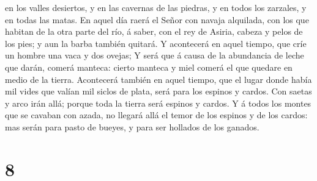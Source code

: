 en los valles desiertos, y en las cavernas de las piedras, y en todos
los zarzales, y en todas las matas.  En aquel día raerá
el Señor con navaja alquilada, con los que habitan de la otra parte del
río, á saber, con el rey de Asiria, cabeza y pelos de los pies; y aun la
barba también quitará.  Y acontecerá en aquel tiempo, que
críe un hombre una vaca y dos ovejas;  Y será que á causa
de la abundancia de leche que darán, comerá manteca: cierto manteca y
miel comerá el que quedare en medio de la tierra. 
Acontecerá también en aquel tiempo, que el lugar donde había mil vides
que valían mil siclos de plata, será para los espinos y cardos.
 Con saetas y arco irán allá; porque toda la tierra será
espinos y cardos.  Y á todos los montes que se cavaban
con azada, no llegará allá el temor de los espinos y de los cardos: mas
serán para pasto de bueyes, y para ser hollados de los ganados.

\hypertarget{section-7}{%
\section{8}\label{section-7}}

